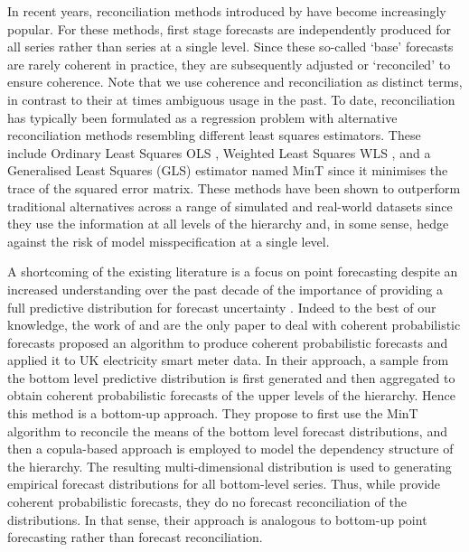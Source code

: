 	
	In recent years, reconciliation methods introduced by \citet{Hyndman2011} have become increasingly popular. For these methods, first stage forecasts are independently produced for all series rather than series at a single level. Since these so-called `base' forecasts are rarely coherent in practice, they are subsequently adjusted or `reconciled' to ensure coherence.  Note that we use coherence and reconciliation as distinct terms, in contrast to their at times ambiguous usage in the past. To date, reconciliation has typically been formulated as a regression problem with alternative reconciliation methods resembling different least squares estimators. These include Ordinary Least Squares {OLS} \citep{Hyndman2011}, Weighted Least Squares {WLS} \citep{AthEtAl2017}, and a Generalised Least Squares (GLS) estimator \citep{Wickramasuriya2018} named MinT since it minimises the trace of the squared error matrix. These methods have been shown to outperform traditional alternatives across a range of simulated and real-world datasets \citep{AthEtAl2009, VanErven2015a, Wickramasuriya2018} since they use the information at all levels of the hierarchy and, in some sense, hedge against the risk of model misspecification at a single level.
	
	A shortcoming of the existing literature is a focus on point forecasting despite an increased understanding over the past decade of the importance of providing a full predictive distribution for forecast uncertainty \citep[see][and references therein]{Gneiting2014}. Indeed to the best of our knowledge, the work of \citet{BenTaieb2017} and \citet{Jeon2018} are the only paper to deal with coherent probabilistic forecasts \citet{BenTaieb2017} proposed an algorithm to produce coherent probabilistic forecasts and applied it to UK electricity smart meter data. In their approach, a sample from the bottom level predictive distribution is first generated and then aggregated to obtain coherent probabilistic forecasts of the upper levels of the hierarchy. Hence this method is a bottom-up approach. They propose to first use the MinT algorithm to reconcile the means of the bottom level forecast distributions, and then a copula-based approach is employed to model the dependency structure of the hierarchy. The resulting multi-dimensional distribution is used to generating empirical forecast distributions for all bottom-level series. Thus, while \citet{BenTaieb2017} provide coherent probabilistic forecasts, they do no forecast reconciliation of the distributions. In that sense, their approach is analogous to bottom-up point forecasting rather than forecast reconciliation. 
		
